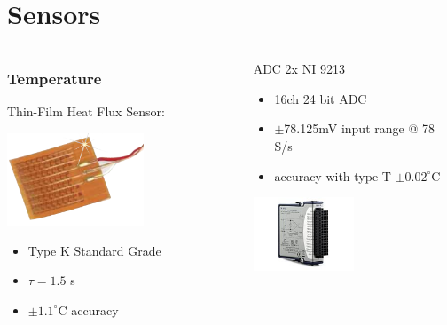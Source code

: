 \documentclass[10pt]{beamer}
\begin{document}


\section{Sensors}
\begin{frame}


\begin{columns}
\begin{column}{0.5\textwidth}
  \frametitle{Temperature}
Thin-Film Heat Flux Sensor:
 \begin{center}
     \includegraphics[width=0.6\textwidth]{film}
     \end{center}
\begin{itemize}
\item Type K Standard Grade
\item $\tau = 1.5$ s
\item $\pm 1.1^{\circ}$C accuracy

\end{itemize}
\end{column}
\begin{column}{0.5\textwidth}  %
  ADC 2x NI 9213 
     
     \begin{itemize}
      \item 16ch 24 bit ADC
      \item $\pm$78.125mV input range @ 78 S/s
      \item accuracy with type T $\pm 0.02^{\circ}$C
      \end{itemize}
      
       \begin{center}
     \includegraphics[width=0.5\textwidth]{adc}
     \end{center}
\end{column}
\end{columns}
\end{frame}
\end{document}
